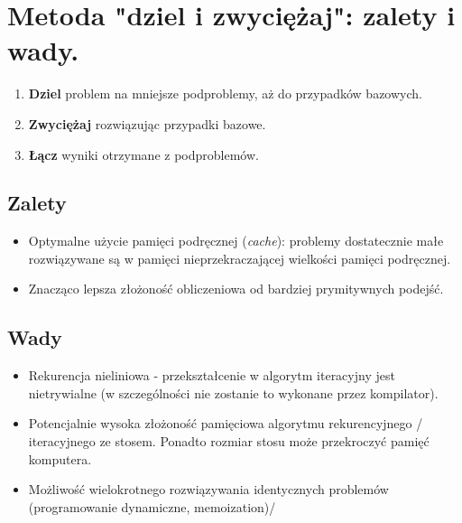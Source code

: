 \documentclass[main.tex]{subfiles}
\begin{document}
    \section{Metoda "dziel i zwyciężaj": zalety i wady.}

    \begin{enumerate}[noitemsep]
        \item \textbf{Dziel} problem na mniejsze podproblemy, aż do przypadków bazowych.
        \item \textbf{Zwyciężaj} rozwiązując przypadki bazowe.
        \item \textbf{Łącz} wyniki otrzymane z podproblemów.
    \end{enumerate}

    \subsection{Zalety}

    \begin{itemize}
        \item Optymalne użycie pamięci podręcznej (\textit{cache}): problemy dostatecznie małe
        rozwiązywane są w pamięci nieprzekraczającej wielkości pamięci podręcznej.

        \item Znacząco lepsza złożoność obliczeniowa od bardziej prymitywnych podejść.
    \end{itemize}

    \subsection{Wady}

    \begin{itemize}
        \item Rekurencja nieliniowa - przekształcenie w algorytm iteracyjny jest nietrywialne (w szczególności nie
        zostanie to wykonane przez kompilator).

        \item Potencjalnie wysoka złożoność pamięciowa algorytmu rekurencyjnego / iteracyjnego ze stosem.
        Ponadto rozmiar stosu może przekroczyć pamięć komputera.

        \item Możliwość wielokrotnego rozwiązywania identycznych problemów (programowanie dynamiczne, memoization)/
    \end{itemize}
\end{document}
